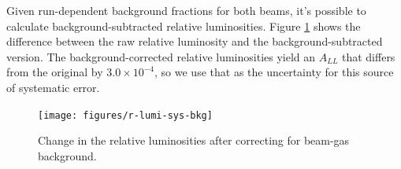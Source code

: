 Given run-dependent background fractions for both beams, it's possible to
calculate background-subtracted relative luminosities. Figure
\ref{fig:r-lumi-sys-bkg} shows the difference between the raw relative
luminosity and the background-subtracted version. The background-corrected
relative luminosities yield an $A_{LL}$ that differs from the original by
$3.0\times10^{-4}$, so we use that as the uncertainty for this source of
systematic error.

\begin{figure}
  \begin{center}
    \texttt{[image: figures/r-lumi-sys-bkg]}
  \end{center}
  \caption{Change in the relative luminosities after correcting for beam-gas
  background.}
  \label{fig:r-lumi-sys-bkg}
\end{figure}
